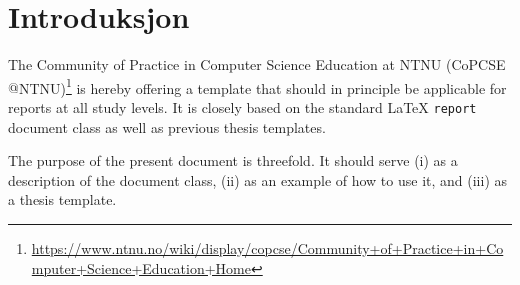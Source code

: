 \section{Introduksjon}

The Community of Practice in Computer Science Education at NTNU (CoPCSE\-$@$NTNU)\footnote{\url{https://www.ntnu.no/wiki/display/copcse/Community+of+Practice+in+Computer+Science+Education+Home}} is hereby offering a template that should in principle be applicable for reports at all study levels. It is closely based on the standard \LaTeX{} \texttt{report} document class as well as previous thesis templates.

The purpose of the present document is threefold. It should serve (i) as a description of the document class, (ii) as an example of how to use it, and (iii) as a thesis template.